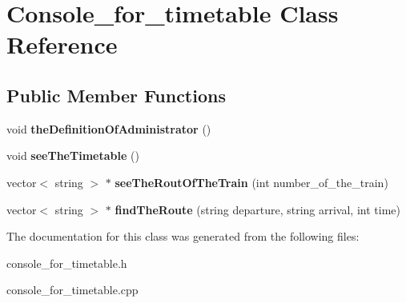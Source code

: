 \hypertarget{class_console__for__timetable}{}\section{Console\+\_\+for\+\_\+timetable Class Reference}
\label{class_console__for__timetable}
\subsection*{Public Member Functions}
\begin{DoxyCompactItemize}
\item 
void {\bfseries the\+Definition\+Of\+Administrator} ()\hypertarget{class_console__for__timetable_a1877d7e976b0e7bbc59c2d5559a439c3}{}\label{class_console__for__timetable_a1877d7e976b0e7bbc59c2d5559a439c3}

\item 
void {\bfseries see\+The\+Timetable} ()\hypertarget{class_console__for__timetable_a11ead9e021b7e0262a48e212f37e85f8}{}\label{class_console__for__timetable_a11ead9e021b7e0262a48e212f37e85f8}

\item 
vector$<$ string $>$ $\ast$ {\bfseries see\+The\+Rout\+Of\+The\+Train} (int number\+\_\+of\+\_\+the\+\_\+train)\hypertarget{class_console__for__timetable_a0b7852e65c3489be08e7c51cf5ba1520}{}\label{class_console__for__timetable_a0b7852e65c3489be08e7c51cf5ba1520}

\item 
vector$<$ string $>$ $\ast$ {\bfseries find\+The\+Route} (string departure, string arrival, int time)\hypertarget{class_console__for__timetable_a805e6b60b40b6589352300c00dc95dcd}{}\label{class_console__for__timetable_a805e6b60b40b6589352300c00dc95dcd}

\end{DoxyCompactItemize}


The documentation for this class was generated from the following files\+:\begin{DoxyCompactItemize}
\item 
console\+\_\+for\+\_\+timetable.\+h\item 
console\+\_\+for\+\_\+timetable.\+cpp\end{DoxyCompactItemize}
